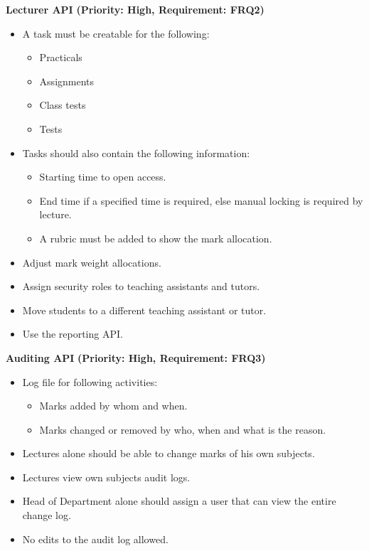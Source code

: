 \documentclass[12pt]{article}
\begin{document}
		\textbf{Lecturer API}
		\textbf{(Priority: High, Requirement: FRQ2)}
		\begin{itemize}
			\item A task must be creatable for the following:
					\begin{itemize}
						\item Practicals
						\item Assignments
						\item Class tests
						\item Tests
					\end{itemize}
			\item Tasks should also contain the following information:
					\begin{itemize}
						\item Starting time to open access.
						\item End time if a specified time is required, else manual locking is required by lecture.
						\item A rubric must be added to show the mark allocation.
					\end{itemize}
			\item Adjust mark weight allocations.
			\item Assign security roles to teaching assistants and tutors.
			\item Move students to a different teaching assistant or tutor.
			\item Use the reporting API.
		\end{itemize}
		
		\vspace{0.15in}
		
		\textbf{Auditing API}
		\textbf{(Priority: High, Requirement: FRQ3)}
		\begin{itemize}
			\item Log file for following activities:
					\begin{itemize}
					 	\item Marks added by whom and when.
					 	\item Marks changed or removed by who, when and what is the reason.
					\end{itemize}
			\item Lectures alone should be able to change marks of his own subjects.
			\item Lectures view own subjects audit logs.
			\item Head of Department alone should assign a user that can view the entire change log.
			\item No edits to the audit log allowed.
		\end{itemize}
		
\end{document}
